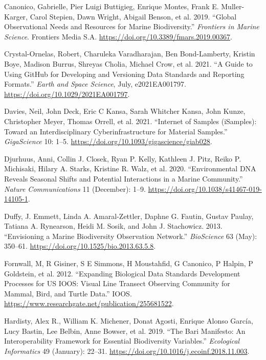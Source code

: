 \documentclass[
]{book}
\newlength{\cslhangindent}
\newlength{\cslentryspacingunit} %
\newenvironment{CSLReferences}[2] %
 {%
  \setlength{\parindent}{0pt}
  \ifodd #1
  \let\oldpar\par
  \def\par{\hangindent=\cslhangindent\oldpar}
  \fi
  \setlength{\parskip}{#2\cslentryspacingunit}
 }%
 {}
\begin{document}
\begin{CSLReferences}{1}{0}
\leavevmode{}%
Canonico, Gabrielle, Pier Luigi Buttigieg, Enrique Montes, Frank E. Muller-Karger, Carol Stepien, Dawn Wright, Abigail Benson, et al. 2019. {``Global Observational Needs and Resources for Marine Biodiversity.''} \emph{Frontiers in Marine Science}. Frontiers Media S.A. \url{https://doi.org/10.3389/fmars.2019.00367}.

\leavevmode{}%
Crystal-Ornelas, Robert, Charuleka Varadharajan, Ben Bond-Lamberty, Kristin Boye, Madison Burrus, Shreyas Cholia, Michael Crow, et al. 2021. {``A Guide to Using GitHub for Developing and Versioning Data Standards and Reporting Formats.''} \emph{Earth and Space Science}, July, e2021EA001797. \url{https://doi.org/10.1029/2021EA001797}.

\leavevmode{}%
Davies, Neil, John Deck, Eric C Kansa, Sarah Whitcher Kansa, John Kunze, Christopher Meyer, Thomas Orrell, et al. 2021. {``Internet of Samples (iSamples): Toward an Interdisciplinary Cyberinfrastructure for Material Samples.''} \emph{GigaScience} 10: 1--5. \url{https://doi.org/10.1093/gigascience/giab028}.

\leavevmode{}%
Djurhuus, Anni, Collin J. Closek, Ryan P. Kelly, Kathleen J. Pitz, Reiko P. Michisaki, Hilary A. Starks, Kristine R. Walz, et al. 2020. {``Environmental DNA Reveals Seasonal Shifts and Potential Interactions in a Marine Community.''} \emph{Nature Communications} 11 (December): 1--9. \url{https://doi.org/10.1038/s41467-019-14105-1}.

\leavevmode{}%
Duffy, J. Emmett, Linda A. Amaral-Zettler, Daphne G. Fautin, Gustav Paulay, Tatiana A. Rynearson, Heidi M. Sosik, and John J. Stachowicz. 2013. {``Envisioning a Marine Biodiversity Observation Network.''} \emph{BioScience} 63 (May): 350--61. \url{https://doi.org/10.1525/bio.2013.63.5.8}.

\leavevmode{}%
Fornwall, M, R Gisiner, S E Simmons, H Moustahfid, G Canonico, P Halpin, P Goldstein, et al. 2012. {``Expanding Biological Data Standards Development Processes for US IOOS: Visual Line Transect Observing Community for Mammal, Bird, and Turtle Data.''} IOOS. \url{https://www.researchgate.net/publication/255681522}.

\leavevmode{}%
Hardisty, Alex R., William K. Michener, Donat Agosti, Enrique Alonso García, Lucy Bastin, Lee Belbin, Anne Bowser, et al. 2019. {``The Bari Manifesto: An Interoperability Framework for Essential Biodiversity Variables.''} \emph{Ecological Informatics} 49 (January): 22--31. \url{https://doi.org/10.1016/j.ecoinf.2018.11.003}.


\end{CSLReferences}
\end{document}
